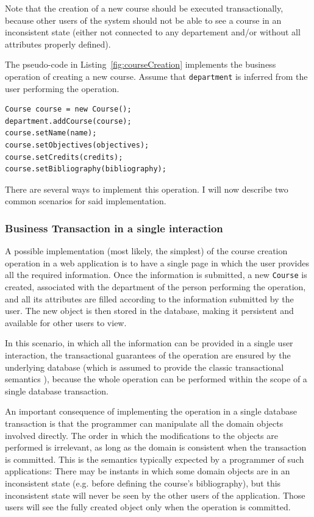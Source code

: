 \documentclass{llncs}
\begin{document}
Note that the creation of a new course should be executed
transactionally, because other users of the system should not be able
to see a course in an inconsistent state (either not connected to any
departement and/or without all attributes properly defined).

The pseudo-code in Listing~\ref{fig:courseCreation} implements the
business operation of creating a new course. Assume that
\texttt{department} is inferred from the user performing the
operation.

\begin{lstlisting}[float, caption={Pseudo-Code for the creation of a
    new course. A new Course is created, associated with its
    department, and its attributes are filled.},
  label={fig:courseCreation}]
Course course = new Course();
department.addCourse(course);
course.setName(name);
course.setObjectives(objectives);
course.setCredits(credits);
course.setBibliography(bibliography);
\end{lstlisting}

There are several ways to implement this operation. I will now
describe two common scenarios for said implementation.

\subsubsection{Business Transaction in a single interaction}

A possible implementation (most likely, the simplest) of the course
creation operation in a web application is to have a single page in
which the user provides all the required information. Once the
information is submitted, a new \texttt{Course} is created, associated
with the department of the person performing the operation, and all
its attributes are filled according to the information submitted by
the user. The new object is then stored in the database, making it
persistent and available for other users to view.

In this scenario, in which all the information can be provided in a
single user interaction, the transactional guarantees of the operation
are ensured by the underlying database (which is assumed to provide
the classic transactional semantics \cite{gray1981transaction}),
because the whole operation can be performed within the scope of a
single database transaction.

An important consequence of implementing the operation in a single
database transaction is that the programmer can manipulate all the
domain objects involved directly. The order in which the modifications
to the objects are performed is irrelevant, as long as the domain is
consistent when the transaction is committed. This is the semantics
typically expected by a programmer of such applications: There may be
instants in which some domain objects are in an inconsistent state
(e.g. before defining the course's bibliography), but this
inconsistent state will never be seen by the other users of the
application. Those users will see the fully created object only when
the operation is committed.
\end{document}
